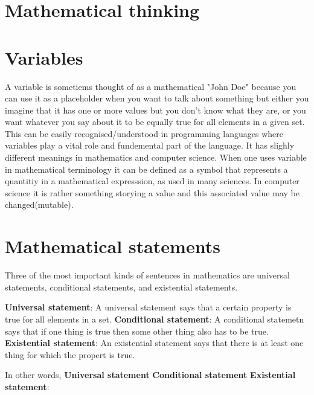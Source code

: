 \section{Mathematical thinking}
\section{Variables}
A variable is sometiems thought of as a mathematical "John Doe" because you can use it as a placeholder when you want to talk about 
something but either you imagine that it has one or more values but you don't know what they are, or you want whatever you say
about it to be equally true for all elements in a given set. This can be easily recognised/understood in programming languages where variables play a vital role and 
fundemental part of the language. It has slighly different meanings in mathematics and computer science. When one uses variable in mathematical terminology it can be defined
as a symbol that represents a quantitiy in a mathematical expresssion, as used in many sciences. In computer science it is rather something storying a value and this associated value may be changed(mutable).


\section{Mathematical statements}
Three of the most important kinds of sentences in mathematics are universal statements, conditional statements, and existential statements.

\textbf{Universal statement}: A universal statement says that a certain property is true for all elements in a set. 
\textbf{Conditional statement}: A conditional statemetn says that if one thing is true then some other thing also has to be true.
\textbf{Existential statement}:   An existential statement says that there is at least one thing for which the propert is true.


In other words,
\textbf{Universal statement}
\textbf{Conditional statement}
\textbf{Existential statement}: